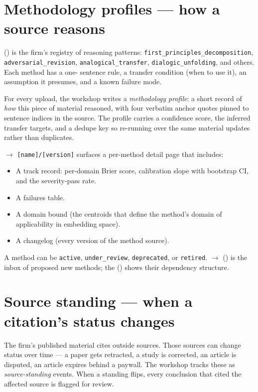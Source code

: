 \documentclass[11pt]{article}
\begin{document}
\section{Methodology profiles --- how a source reasons}

 () is the firm's registry of reasoning
patterns: \texttt{first\_principles\_decomposition},
\texttt{adversarial\_revision}, \texttt{analogical\_transfer},
\texttt{dialogic\_unfolding}, and others. Each method has a one-
sentence rule, a transfer condition (when to use it), an assumption
it presumes, and a known failure mode.

For every upload, the workshop writes a \emph{methodology profile}: a
short record of \emph{how} this piece of material reasoned, with four
verbatim anchor quotes pinned to sentence indices in the source. The
profile carries a confidence score, the inferred transfer targets, and
a dedupe key so re-running over the same material updates rather than
duplicates.

 $\to$ \texttt{[name]/[version]} surfaces a per-method
detail page that includes:

\begin{itemize}[leftmargin=*,itemsep=0.2em]
  \item A track record: per-domain Brier score, calibration slope with
        bootstrap CI, and the severity-pass rate.
  \item A failures table.
  \item A domain bound (the centroids that define the method's domain
        of applicability in embedding space).
  \item A changelog (every version of the method source).
\end{itemize}

A method can be \texttt{active}, \texttt{under\_review},
\texttt{deprecated}, or \texttt{retired}.  $\to$
 () is the inbox of
proposed new methods; the 
() shows their dependency structure.

\section{Source standing --- when a citation's status changes}

The firm's published material cites outside sources. Those sources can
change status over time --- a paper gets retracted, a study is
corrected, an article is disputed, an article expires behind a
paywall. The workshop tracks these as \emph{source-standing} events.
When a standing flips, every conclusion that cited the affected source
is flagged for review.
\end{document}
